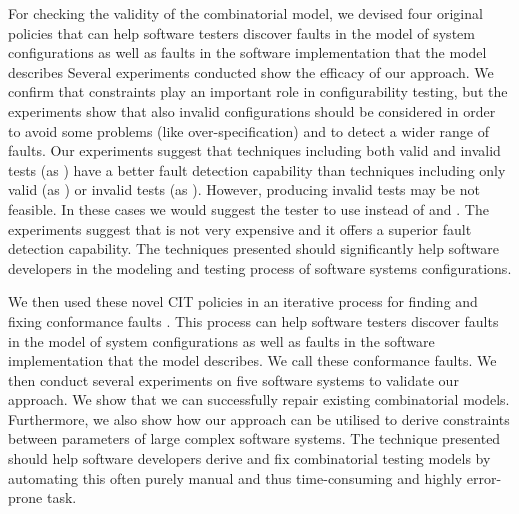 \begin{tikzborder}{\cite{Gargantini16:validation}}
\begin{tikzborder}{\cite{gargantini_combinatorial_2017}}
\begin{tikzborder}{\cite{gargantini_combinatorial_2017}}
\begin{tikzborder}{\cite{garn2019}}
For checking the validity of the combinatorial model, we devised four original policies that can help software testers discover faults in the model of system configurations as well as faults in the software implementation that the model describes \cite{Gargantini16:validation} Several experiments conducted show the efficacy of our approach.   We confirm that constraints play an important role in configurability testing, but the experiments show that also invalid configurations should be considered in order to avoid some problems (like over-specification) and to detect a wider range of faults. 
Our experiments suggest that techniques including both valid and invalid tests (as \cucv) have a better fault detection capability than techniques including only valid (as \ccit) or invalid tests (as \cv). However, producing invalid tests may be not feasible. In these cases we would suggest the tester to use \CCi instead of \ic and \ccit. The experiments suggest that \CCi is not very expensive and it offers a superior fault detection capability. The techniques presented should significantly help software developers in the modeling and testing process of software systems configurations.

We then used these novel CIT policies in an iterative process for finding and fixing conformance faults \cite{gargantini_combinatorial_2017}. This process can help software testers discover faults in the model of system configurations as well as faults in the software implementation that the model describes. We call these conformance faults.
We then conduct several experiments on five software systems to validate our approach. We show that we can successfully repair existing combinatorial models. Furthermore, we also show how our approach can be utilised to derive constraints between parameters of large complex software systems. The technique presented should help software developers derive and fix combinatorial testing models by automating this often purely manual and thus time-consuming and highly error-prone task.


\end{tikzborder}
\end{tikzborder}
\end{tikzborder}
\end{tikzborder}
